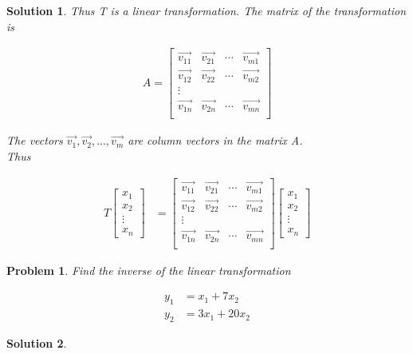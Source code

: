 \documentclass{article}
\newtheorem{problem}{Problem}
\newtheorem*{solution}{Solution}
\begin{document}
\begin{solution}
Thus T is a linear transformation. The matrix of the transformation is

\begin{align*}
A = \begin{bmatrix}
\vec{v_{11}} & \vec{v_{21}} & \cdots & \vec{v_{m1}} \\
\vec{v_{12}} & \vec{v_{22}} & \cdots & \vec{v_{m2}} \\
\vdots \\
\vec{v_{1n}} & \vec{v_{2n}} & \cdots & \vec{v_{mn}} \\
\end{bmatrix}
\end{align*}

The vectors $\vec{v_{1}}, \vec{v_{2}}, ..., \vec{v_{m}}$ are column vectors in the matrix A. \\

Thus 

\begin{align*}
T \begin{bmatrix} x_{1} \\ x_{2} \\ \vdots \\ x_{n} \end{bmatrix} &= \begin{bmatrix}
\vec{v_{11}} & \vec{v_{21}} & \cdots & \vec{v_{m1}} \\
\vec{v_{12}} & \vec{v_{22}} & \cdots & \vec{v_{m2}} \\
\vdots \\
\vec{v_{1n}} & \vec{v_{2n}} & \cdots & \vec{v_{mn}} \\
\end{bmatrix} 
\begin{bmatrix} x_{1} \\ x_{2} \\ \vdots \\ x_{n} \end{bmatrix}
\end{align*}
\end{solution}

\begin{problem}
Find the inverse of the linear transformation 

\begin{align*}
y_{1} &= x_{1} + 7x_{2} \\
y_{2} &= 3x_{1} + 20x_{2}
\end{align*}
\end{problem}

\begin{solution}
\end{solution}
\end{document}
